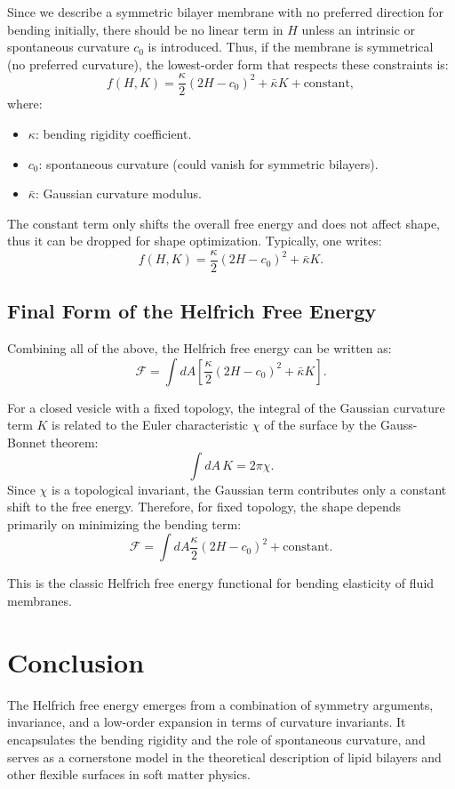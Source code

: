 \documentclass[12pt,a4paper]{article}
\begin{document}
Since we describe a symmetric bilayer membrane with no preferred direction for bending initially, there should be no linear term in $H$ unless an intrinsic or spontaneous curvature $c_0$ is introduced. Thus, if the membrane is symmetrical (no preferred curvature), the lowest-order form that respects these constraints is:
\[
f(H,K) = \frac{\kappa}{2}(2H - c_0)^2 + \bar{\kappa} K + \text{constant},
\]
where:
\begin{itemize}
    \item $\kappa$: bending rigidity coefficient.
    \item $c_0$: spontaneous curvature (could vanish for symmetric bilayers).
    \item $\bar{\kappa}$: Gaussian curvature modulus.
\end{itemize}

The constant term only shifts the overall free energy and does not affect shape, thus it can be dropped for shape optimization. Typically, one writes:
\[
f(H,K) = \frac{\kappa}{2}(2H - c_0)^2 + \bar{\kappa}K.
\]

\subsection{Final Form of the Helfrich Free Energy}

Combining all of the above, the Helfrich free energy can be written as:
\[
\mathcal{F} = \int dA \left[ \frac{\kappa}{2}(2H - c_0)^2 + \bar{\kappa} K \right].
\]

For a closed vesicle with a fixed topology, the integral of the Gaussian curvature term $K$ is related to the Euler characteristic $\chi$ of the surface by the Gauss-Bonnet theorem:
\[
\int dA \, K = 2\pi \chi.
\]
Since $\chi$ is a topological invariant, the Gaussian term contributes only a constant shift to the free energy. Therefore, for fixed topology, the shape depends primarily on minimizing the bending term:
\[
\mathcal{F} = \int dA \frac{\kappa}{2}(2H - c_0)^2 + \text{constant}.
\]

This is the classic Helfrich free energy functional for bending elasticity of fluid membranes.

\section{Conclusion}

The Helfrich free energy emerges from a combination of symmetry arguments, invariance, and a low-order expansion in terms of curvature invariants. It encapsulates the bending rigidity and the role of spontaneous curvature, and serves as a cornerstone model in the theoretical description of lipid bilayers and other flexible surfaces in soft matter physics.
\end{document}
